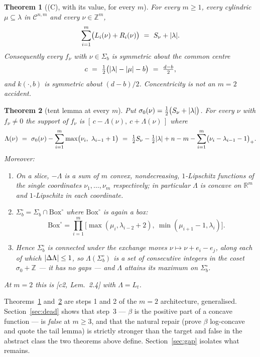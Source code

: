 \documentclass[11pt]{article}
\newtheorem{theorem}{Theorem}[section]
\theoremstyle{definition}
\newcommand{\Z}{\mathbb Z}
\newcommand{\R}{\mathbb R}
\newcommand{\Bx}{\mathrm{Box}}
\DeclarePairedDelimiter{\abs}{\lvert}{\rvert}
\begin{document}
\begin{theorem}[(C), with its value, for every $m$]\label{thm:C}
For every $m\ge1$, every cylindric $\mu\subseteq\lambda$ in $\mathcal C^{n,m}$ and every
$\nu\in\Z^m$,
\[
  \sum_{i=1}^m\bigl(L_i(\nu)+R_i(\nu)\bigr)\ =\ S_\nu+\abs{\lambda}.
\]
Consequently every $f_\nu$ with $\nu\in\Sigma_b$ is symmetric about the common centre
\[
  c\ =\ \tfrac12\bigl(\abs{\lambda}-\abs{\mu}-b\bigr)\ =\ \tfrac{d-b}{2},
\]
and $k(\cdot,b)$ is symmetric about $(d-b)/2$. Concentricity is not an $m=2$ accident.
\end{theorem}

\begin{theorem}[tent lemma at every $m$]\label{thm:tent}
Put $\sigma_0(\nu)=\tfrac12\bigl(S_\nu+\abs{\lambda}\bigr)$. For every $\nu$ with
$f_\nu\ne0$ the support of $f_\nu$ is $[\,c-\Lambda(\nu),\ c+\Lambda(\nu)\,]$ where
\begin{equation}\label{eq:Lam}
  \Lambda(\nu)\ =\ \sigma_0(\nu)-\sum_{i=1}^m\max\bigl(\nu_i,\ \lambda_{i-1}+1\bigr)
  \ =\ \tfrac12 S_\nu-\tfrac12\abs{\lambda}+n-m-\sum_{i=1}^m\bigl(\nu_i-\lambda_{i-1}-1\bigr)_+ .
\end{equation}
Moreover:
\begin{enumerate}
\item On a slice, $-\Lambda$ is a sum of $m$ convex, nondecreasing, $1$-Lipschitz functions
of the \emph{single} coordinates $\nu_1,\dots,\nu_m$ respectively; in particular $\Lambda$
is concave on $\R^m$ and $1$-Lipschitz in each coordinate.
\item $\Sigma_b^\circ=\Sigma_b\cap\Bx^\circ$ where $\Bx^\circ$ is again a box:
\begin{equation}\label{eq:effbox}
  \Bx^{\circ}=\prod_{i=1}^m\bigl[\max(\mu_i,\lambda_{i-2}+2),\ \min(\mu_{i+1}-1,\lambda_i)\bigr].
\end{equation}
\item Hence $\Sigma^\circ_b$ is connected under the exchange moves
$\nu\mapsto\nu+e_i-e_j$, along each of which $\abs{\Delta\Lambda}\le1$, so
$\Lambda(\Sigma^\circ_b)$ is a set of \emph{consecutive} integers in the coset
$\sigma_0+\Z$ --- it has no gaps --- and $\Lambda$ attains its maximum on $\Sigma^\circ_b$.
\end{enumerate}
At $m=2$ this is [c2, Lem.~2.4] with $\Lambda=L_t$.
\end{theorem}

Theorems~\ref{thm:C} and~\ref{thm:tent} are steps 1 and 2 of the $m=2$ architecture,
generalised. Section~\ref{sec:dead} shows that step~3 --- $\beta$ is the positive part of a
concave function --- is \emph{false} at $m\ge3$, and that the natural repair (prove $\beta$
log-concave and quote the tail lemma) is strictly stronger than the target and false in the
abstract class the two theorems above define. Section~\ref{sec:gap} isolates what remains.
\end{document}
